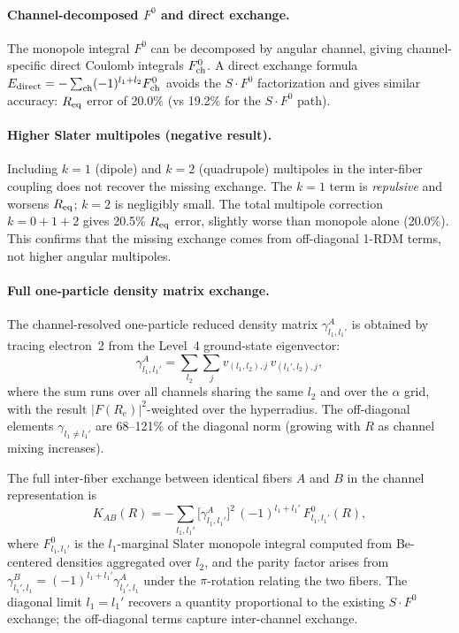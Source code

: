 \documentclass[aps,pra,twocolumn,superscriptaddress,longbibliography,floatfix]{revtex4-2}
\begin{document}
\paragraph{Channel-decomposed $F^0$ and direct exchange.}
The monopole integral $F^0$ can be decomposed by angular channel,
giving channel-specific direct Coulomb integrals $F^0_{\rm ch}$.
A direct exchange formula
$E_{\rm direct} = -\sum_{\rm ch} (-1)^{l_1 + l_2} F^0_{\rm ch}$
avoids the $S \cdot F^0$ factorization and gives similar accuracy:
$R_{\rm eq}$ error of 20.0\% (vs 19.2\% for the $S \cdot F^0$ path).

\paragraph{Higher Slater multipoles (negative result).}
Including $k = 1$ (dipole) and $k = 2$ (quadrupole) multipoles in
the inter-fiber coupling does not recover the missing exchange.
The $k = 1$ term is \emph{repulsive} and worsens $R_{\rm eq}$;
$k = 2$ is negligibly small.  The total multipole correction
$k = 0 + 1 + 2$ gives 20.5\% $R_{\rm eq}$ error, slightly worse
than monopole alone (20.0\%).  This confirms that the missing
exchange comes from off-diagonal 1-RDM terms, not higher angular
multipoles.

\paragraph{Full one-particle density matrix exchange.}
The channel-resolved one-particle reduced density matrix
$\gamma^A_{l_1, l_1'}$ is obtained by tracing electron~2 from the
Level~4 ground-state eigenvector:
\begin{equation}
  \gamma^A_{l_1, l_1'}
    = \sum_{l_2} \sum_j v_{(l_1, l_2), j}\, v_{(l_1', l_2), j},
\end{equation}
where the sum runs over all channels sharing the same $l_2$ and
over the $\alpha$ grid, with the result $|F(R_e)|^2$-weighted
over the hyperradius.  The off-diagonal elements
$\gamma_{l_1 \ne l_1'}$ are 68--121\% of the diagonal norm
(growing with $R$ as channel mixing increases).

The full inter-fiber exchange between identical fibers $A$ and $B$
in the channel representation is
\begin{equation}
  K_{AB}(R) = -\sum_{l_1, l_1'}
    \bigl[\gamma^A_{l_1, l_1'}\bigr]^2\,
    (-1)^{l_1 + l_1'}\,
    F^0_{l_1, l_1'}(R),
  \label{eq:full_exchange}
\end{equation}
where $F^0_{l_1, l_1'}$ is the $l_1$-marginal Slater monopole
integral computed from Be-centered densities aggregated over $l_2$,
and the parity factor arises from $\gamma^B_{l_1', l_1}
= (-1)^{l_1 + l_1'} \gamma^A_{l_1', l_1}$ under the $\pi$-rotation
relating the two fibers.  The diagonal limit $l_1 = l_1'$ recovers a
quantity proportional to the existing $S \cdot F^0$ exchange; the
off-diagonal terms capture inter-channel exchange.
\end{document}
